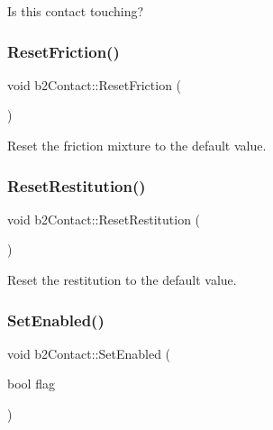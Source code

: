 Is this contact touching? 

\mbox{\label{classb2_contact_ad66d9290da187cef4c9f48c5766d4460}} 
\subsubsection{\texorpdfstring{ResetFriction()}{ResetFriction()}}
{\footnotesize\ttfamily void b2\+Contact\+::\+Reset\+Friction (\begin{DoxyParamCaption}{ }\end{DoxyParamCaption})\hspace{0.3cm}{\ttfamily [inline]}}



Reset the friction mixture to the default value. 

\mbox{\label{classb2_contact_a243501bc5c146e9eb1296162d328aef1}} 
\subsubsection{\texorpdfstring{ResetRestitution()}{ResetRestitution()}}
{\footnotesize\ttfamily void b2\+Contact\+::\+Reset\+Restitution (\begin{DoxyParamCaption}{ }\end{DoxyParamCaption})\hspace{0.3cm}{\ttfamily [inline]}}



Reset the restitution to the default value. 

\mbox{\label{classb2_contact_a6edf582f8c161d6632854cddefe55a0c}} 
\subsubsection{\texorpdfstring{SetEnabled()}{SetEnabled()}}
{\footnotesize\ttfamily void b2\+Contact\+::\+Set\+Enabled (\begin{DoxyParamCaption}\item[{bool}]{flag }\end{DoxyParamCaption})\hspace{0.3cm}{\ttfamily [inline]}}

